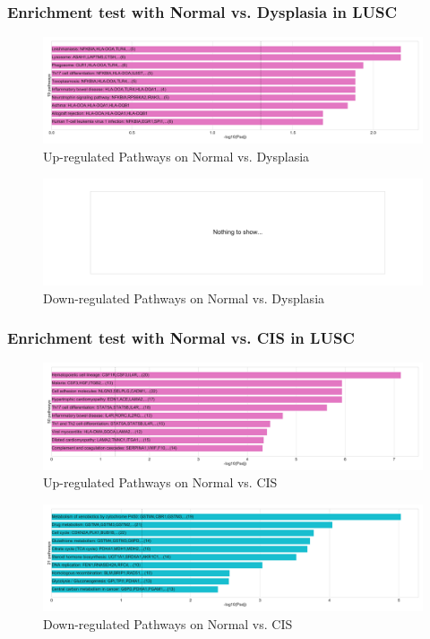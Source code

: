 \documentclass{beamer}
\begin{document}
    \begin{frame}
        \frametitle{Enrichment test with Normal vs. Dysplasia in LUSC}

        \begin{figure}
            \includegraphics[width=0.8 \linewidth]{figures/DEG/Enrichment/STAR.SQC.Normal-Dysplasia.Up.KEGG.pdf}
            \caption{Up-regulated Pathways on Normal vs. Dysplasia}
        \end{figure}

        \begin{figure}
            \includegraphics[width=0.8 \linewidth]{figures/DEG/Enrichment/STAR.SQC.Normal-Dysplasia.Down.KEGG.pdf}
            \caption{Down-regulated Pathways on Normal vs. Dysplasia}
        \end{figure}
    \end{frame}

    \begin{frame}
        \frametitle{Enrichment test with Normal vs. CIS in LUSC}

        \begin{figure}
            \includegraphics[width=0.8 \linewidth]{figures/DEG/Enrichment/STAR.SQC.Normal-CIS.Up.KEGG.pdf}
            \caption{Up-regulated Pathways on Normal vs. CIS}
        \end{figure}

        \begin{figure}
            \includegraphics[width=0.8 \linewidth]{figures/DEG/Enrichment/STAR.SQC.Normal-CIS.Down.KEGG.pdf}
            \caption{Down-regulated Pathways on Normal vs. CIS}
        \end{figure}
    \end{frame}
\end{document}
